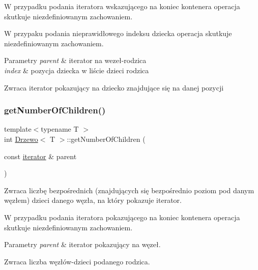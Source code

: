 W przypadku podania iteratora wskazującego na koniec kontenera operacja skutkuje niezdefiniowanym zachowaniem.

W przypaku podania nieprawidłowego indeksu dziecka operacja skutkuje niezdefiniowanym zachowaniem.


\begin{DoxyParams}{Parametry}
{\em parent} & iterator na wezeł-\/rodzica \\
\hline
{\em index} & pozycja dziecka w liście dzieci rodzica \\
\hline
\end{DoxyParams}
\begin{DoxyReturn}{Zwraca}
iterator pokazujący na dziecko znajdujące się na danej pozycji 
\end{DoxyReturn}
\mbox{\label{class_drzewo_a0f5f70f7dfe35ffce3bb5ba3ac23657b}} 
\subsubsection{\texorpdfstring{get\+Number\+Of\+Children()}{getNumberOfChildren()}}
{\footnotesize\ttfamily template$<$typename T $>$ \\
int \hyperlink{class_drzewo}{Drzewo}$<$ T $>$\+::get\+Number\+Of\+Children (\begin{DoxyParamCaption}\item[{const \hyperlink{class_drzewo_1_1iterator}{iterator} \&}]{parent }\end{DoxyParamCaption})\hspace{0.3cm}{\ttfamily [inline]}}

Zwraca liczbę \textquotesingle{}bezpośrednich\textquotesingle{} (znajdujących się bezpośrednio poziom pod danym węzłem) dzieci danego węzła, na który pokazuje iterator.

W przypadku podania iteratora pokazującego na koniec kontenera operacja skutkuje niezdefiniowanym zachowaniem.


\begin{DoxyParams}{Parametry}
{\em parent} & iterator pokazujący na węzeł. \\
\hline
\end{DoxyParams}
\begin{DoxyReturn}{Zwraca}
liczba węzłów-\/dzieci podanego rodzica. 
\end{DoxyReturn}
\mbox{\label{class_drzewo_a3d00b2880e12a416ab749c84ff879a70}} 

